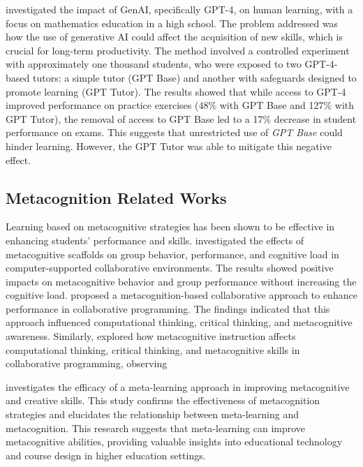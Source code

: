 \documentclass[sn-apa]{sn-jnl} %
\begin{document}
\cite{Bastani24} investigated the impact of GenAI, specifically GPT-4, on human
learning, with a focus on mathematics education in a high school. The problem
addressed was how the use of generative AI could affect the acquisition of new
skills, which is crucial for long-term productivity. The method involved a
controlled experiment with approximately one thousand students, who were exposed
to two GPT-4-based tutors: a simple tutor (GPT Base) and another with safeguards
designed to promote learning (GPT Tutor). The results showed that while access
to GPT-4 improved performance on practice exercises (48\% with GPT Base and
127\% with GPT Tutor), the removal of access to GPT Base led to a 17\% decrease
in student performance on exams. This suggests that unrestricted use of
\textit{GPT Base} could hinder learning. However, the GPT Tutor was able to
mitigate this negative effect.

\subsection{Metacognition Related Works}

Learning based on metacognitive strategies has been shown to be effective in
enhancing students’ performance and skills. \cite{Zheng19} investigated the
effects of metacognitive scaffolds on group behavior, performance, and cognitive
load in computer-supported collaborative environments. The results showed
positive impacts on metacognitive behavior and group performance without
increasing the cognitive load. \cite{LiWei23} proposed a metacognition-based
collaborative approach to enhance performance in collaborative programming. The
findings indicated that this approach influenced computational thinking,
critical thinking, and metacognitive awareness. Similarly, \cite{Wang23}
explored how metacognitive instruction affects computational thinking, critical
thinking, and metacognitive skills in collaborative programming, observing

\cite{Khusnul24} investigates
the efficacy of a meta-learning approach in improving metacognitive and creative
skills. This study confirms the effectiveness of metacognition strategies and
elucidates the relationship between meta-learning and metacognition. This
research suggests that meta-learning can improve metacognitive abilities,
providing valuable insights into educational technology and course design in
higher education settings.
\end{document}
